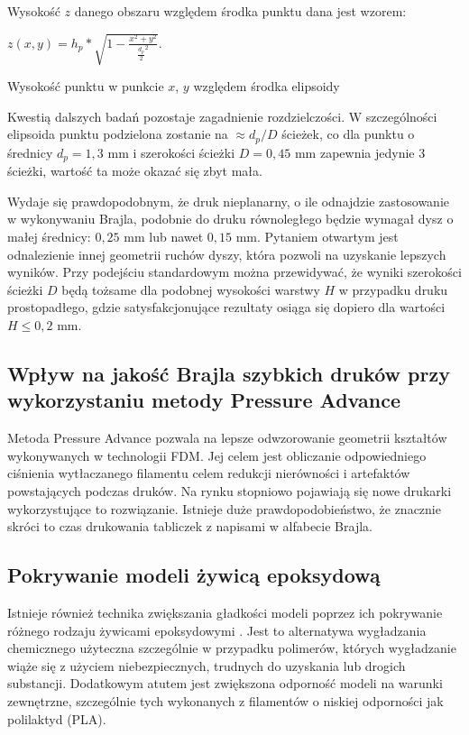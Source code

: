 \documentclass[12pt,a4paper]{article}
\begin{document}
Wysokość $z$ danego obszaru względem środka punktu dana jest wzorem:

\begin{feq}
$z(x,y) = h_p * \sqrt{1 - \frac{x^2+y^2}{\frac{d_p}{2}^2}}$.
\caption{Wysokość punktu w punkcie $x$, $y$ względem środka elipsoidy}
\end{feq}

Kwestią dalszych badań pozostaje zagadnienie rozdzielczości. W szczególności elipsoida punktu podzielona zostanie na $\approx d_p/D$ ścieżek, co dla punktu o średnicy $d_p=1,3 \text{ mm}$ i szerokości ścieżki $D=0,45 \text{ mm}$ zapewnia jedynie 3 ścieżki, wartość ta może okazać się zbyt mała.

Wydaje się prawdopodobnym, że druk nieplanarny, o ile odnajdzie zastosowanie w wykonywaniu Brajla, podobnie do druku równoległego będzie wymagał dysz o małej średnicy: $0,25 \text{ mm}$ lub nawet $0,15 \text{ mm}$. Pytaniem otwartym jest odnalezienie innej geometrii ruchów dyszy, która pozwoli na uzyskanie lepszych wyników.
Przy podejściu standardowym można przewidywać, że wyniki szerokości ścieżki $D$ będą tożsame dla podobnej wysokości warstwy $H$ w przypadku druku prostopadłego, gdzie satysfakcjonujące rezultaty osiąga się dopiero dla wartości $H \leq 0,2 \text{ mm}$.

\subsection{Wpływ na jakość Brajla szybkich druków przy wykorzystaniu metody Pressure Advance}
Metoda Pressure Advance \cite{pressureadvance} pozwala na lepsze odwzorowanie geometrii kształtów wykonywanych w technologii FDM. Jej celem jest obliczanie odpowiedniego ciśnienia wytłaczanego filamentu celem redukcji nierówności i artefaktów powstających podczas druków.
Na rynku stopniowo pojawiają się nowe drukarki wykorzystujące to rozwiązanie. Istnieje duże prawdopodobieństwo, że znacznie skróci to czas drukowania tabliczek z napisami w alfabecie Brajla.

\subsection{Pokrywanie modeli żywicą epoksydową}
Istnieje również technika zwiększania gładkości modeli poprzez ich pokrywanie różnego rodzaju żywicami epoksydowymi \cite{epoxy}. Jest to alternatywa wygładzania chemicznego użyteczna szczególnie w przypadku polimerów, których wygładzanie wiąże się z użyciem niebezpiecznych, trudnych do uzyskania lub drogich substancji.
Dodatkowym atutem jest zwiększona odporność modeli na warunki zewnętrzne, szczególnie tych wykonanych z filamentów o niskiej odporności jak polilaktyd (PLA).
\end{document}

